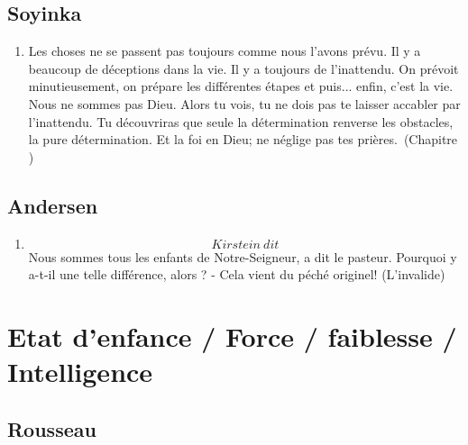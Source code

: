 \documentclass[a4paper, 11pt, hidelinks]{article}
\newcommand{\rb}[1]{\Romanbar{#1}}
\begin{document}
\subsection{Soyinka}


\begin{enumerate}
    \item Les choses ne se passent pas toujours comme nous l'avons prévu. Il y a beaucoup de déceptions dans la vie. Il y a toujours de l'inattendu. On prévoit minutieusement, on prépare les différentes étapes et puis... enfin, c'est la vie. Nous ne sommes pas Dieu. Alors tu vois, tu ne dois pas te laisser accabler par l'inattendu. Tu découvriras que seule la détermination renverse les obstacles, la pure détermination. Et la foi en Dieu; ne néglige pas tes prières. (Chapitre \rb{11})
\end{enumerate}




\subsection{Andersen}


\begin{enumerate}
    \item \[ Kirstein \ dit \] Nous sommes tous les enfants de Notre-Seigneur, a dit le pasteur. Pourquoi y a-t-il une telle différence, alors ? - Cela vient du péché originel! (L'invalide)
\end{enumerate}















\section{Etat d'enfance / Force / faiblesse / Intelligence}



\subsection{Rousseau}
\end{document}
